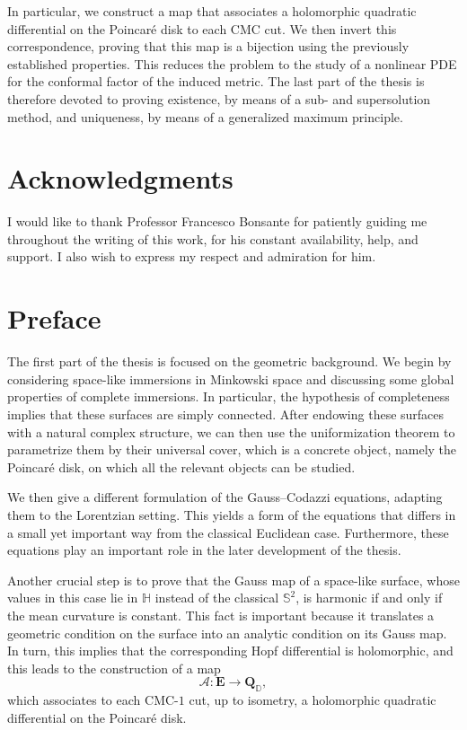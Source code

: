 \documentclass[a4paper,11pt,openright,twoside]{book}
\newcommand{\1}{\mathds{1}}
\theoremstyle{plain}
\theoremstyle{definition}
\theoremstyle{remark}
\begin{document}
In particular, we construct a map that associates a holomorphic quadratic differential on the Poincaré disk to each CMC cut. We then invert this correspondence, proving that this map is a bijection using the previously established properties. This reduces the problem to the study of a nonlinear PDE for the conformal factor of the induced metric. The last part of the thesis is therefore devoted to proving existence, by means of a sub- and supersolution method, and uniqueness, by means of a generalized maximum principle.

\chapter*{Acknowledgments}
	I would like to thank Professor Francesco Bonsante for patiently guiding me throughout the writing of this work, for his constant availability, help, and support. I also wish to express my respect and admiration for him.
\tableofcontents

\chapter{Preface}

The first part of the thesis is focused on the geometric background. We begin by considering space-like immersions in Minkowski space and discussing some global properties of complete immersions. In particular, the hypothesis of completeness implies that these surfaces are simply connected. After endowing these surfaces with a natural complex structure, we can then use the uniformization theorem to parametrize them by their universal cover, which is a concrete object, namely the Poincaré disk, on which all the relevant objects can be studied.

We then give a different formulation of the Gauss--Codazzi equations, adapting them to the Lorentzian setting. This yields a form of the equations that differs in a small yet important way from the classical Euclidean case. Furthermore, these equations play an important role in the later development of the thesis.

Another crucial step is to prove that the Gauss map of a space-like surface, whose values in this case lie in $\mathbb{H}$ instead of the classical $\mathbb{S}^2$, is harmonic if and only if the mean curvature is constant. This fact is important because it translates a geometric condition on the surface into an analytic condition on its Gauss map. In turn, this implies that the corresponding Hopf differential is holomorphic, and this leads to the construction of a map
\[
\mathscr{A}:\mathbf{E}\to\mathbf{Q}_{\mathbb{D}},
\]
which associates to each CMC-$1$ cut, up to isometry, a holomorphic quadratic differential on the Poincaré disk.
\end{document}
